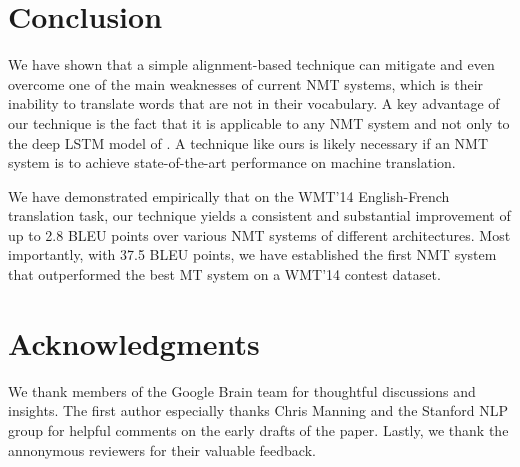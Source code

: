 \documentclass[11pt]{article}
\newcommand{\bestbleuunk}{37.5} \newcommand{\bestbleuunkwmt}{36.6} \newcommand{\bestunkimp}{2.8} \newcommand{\unkimp}{1.9} \newcommand{\unkimpilya}{2.7} \newcommand{\imprare}{4.8}
\begin{document}
 

\section{Conclusion}
\label{sec:conclude}

We have shown that a simple alignment-based technique can mitigate and even
overcome one of the main weaknesses of current NMT systems, which is
their inability to translate words that are not in their vocabulary.  
A key advantage of our technique is the fact that it is applicable to any NMT system and not
only to the deep LSTM model of .  A technique
like ours is likely necessary if an NMT system is to achieve state-of-the-art performance
on machine translation.

We have demonstrated empirically that on the WMT'14 English-French translation task, our technique yields a 
consistent and substantial improvement of up to \bestunkimp{} BLEU points over various NMT systems of different architectures. 
Most importantly, with \bestbleuunk{} BLEU points, we have established the first NMT system that outperformed 
the best MT system on a WMT'14 contest dataset.


 
\section*{Acknowledgments}
We thank members of the Google Brain team for thoughtful discussions and insights. The first author especially thanks Chris Manning and the Stanford NLP group for helpful comments on the early drafts of the paper. Lastly, we thank the annonymous reviewers for their valuable feedback.

 
\end{document}
